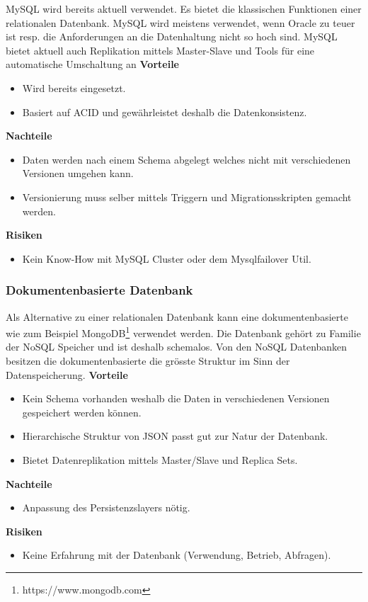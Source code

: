 MySQL wird bereits aktuell verwendet. Es bietet die klassischen Funktionen einer relationalen Datenbank. MySQL wird meistens verwendet, wenn Oracle zu teuer ist resp. die Anforderungen an die Datenhaltung nicht so hoch sind. MySQL bietet aktuell auch Replikation mittels Master-Slave und Tools für eine automatische Umschaltung an
\newline
\newline
\textbf{Vorteile}
\begin{itemize}
	\item Wird bereits eingesetzt.
	\item Basiert auf \gls{ACID} und gewährleistet deshalb die Datenkonsistenz.
\end{itemize}
\textbf{Nachteile}
\begin{itemize}
	\item Daten werden nach einem Schema abgelegt welches nicht mit verschiedenen Versionen umgehen kann.
	\item Versionierung muss selber mittels Triggern und Migrationsskripten gemacht werden.
\end{itemize}
\textbf{Risiken}
\begin{itemize}
	\item Kein Know-How mit MySQL Cluster oder dem Mysqlfailover Util.
\end{itemize}

\subsubsection{Dokumentenbasierte Datenbank}

Als Alternative zu einer relationalen Datenbank kann eine dokumentenbasierte wie zum Beispiel MongoDB\footnote{https://www.mongodb.com} verwendet werden. Die Datenbank gehört zu Familie der \Gls{NoSQL} Speicher und ist deshalb schemalos. Von den \gls{NoSQL} Datenbanken besitzen die dokumentenbasierte die grösste Struktur im Sinn der Datenspeicherung.
\newline
\newline
\textbf{Vorteile}
\begin{itemize}
	\item Kein Schema vorhanden weshalb die Daten in verschiedenen Versionen gespeichert werden können.
	\item Hierarchische Struktur von JSON passt gut zur Natur der Datenbank.
	\item Bietet Datenreplikation mittels Master/Slave und Replica Sets.
\end{itemize}
\textbf{Nachteile}
\begin{itemize}
	\item Anpassung des Persistenzslayers nötig.
\end{itemize}
\textbf{Risiken}
\begin{itemize}
	\item Keine Erfahrung mit der Datenbank (Verwendung, Betrieb, Abfragen).
\end{itemize}

